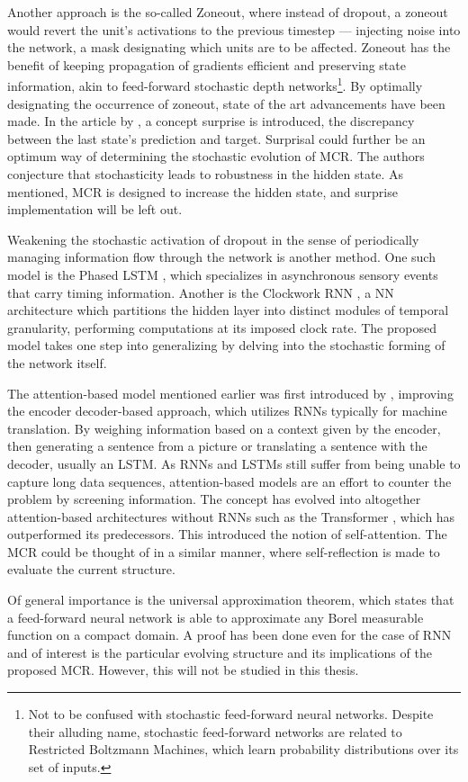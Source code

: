 Another approach is the so-called Zoneout\cite{zoneo}, where instead of dropout, a zoneout would revert the unit's activations to the previous timestep — injecting noise into the network, a mask designating which units are to be affected. Zoneout has the benefit of keeping propagation of gradients efficient and preserving state information, akin to feed-forward stochastic depth networks\footnote{Not to be confused with stochastic feed-forward neural networks. Despite their alluding name, stochastic feed-forward networks are related to Restricted Boltzmann Machines, which learn probability distributions over its set of inputs.}. By optimally designating the occurrence of zoneout, state of the art advancements have been made\cite{Zoneout}. In the article by \textcite{Zoneout}, a concept surprise is introduced, the discrepancy between the last state's prediction and target. Surprisal could further be an optimum way of determining the stochastic evolution of MCR. The authors \textcite{Zoneout} conjecture that stochasticity leads to robustness in the hidden state. As mentioned, MCR is designed to increase the hidden state, and surprise implementation will be left out.

Weakening the stochastic activation of dropout in the sense of periodically managing information flow through the network is another method. One such model is the Phased LSTM \cite{phaselstm}, which specializes in asynchronous sensory events that carry timing information. Another is the Clockwork RNN \cite{Clockwork}, a NN architecture which partitions the hidden layer into distinct modules of temporal granularity, performing computations at its imposed clock rate. The proposed model takes one step into generalizing by delving into the stochastic forming of the network itself.

The attention-based model mentioned earlier was first introduced by \textcite{att}, improving the encoder decoder-based approach, which utilizes RNNs typically for machine translation. By weighing information based on a context given by the encoder, then generating a sentence from a picture or translating a sentence with the decoder, usually an LSTM. As RNNs and LSTMs still suffer from being unable to capture long data sequences, attention-based models are an effort to counter the problem by screening information. The concept has evolved into altogether attention-based architectures without RNNs such as the Transformer \cite{trans}, which has outperformed its predecessors. This introduced the notion of self-attention. The MCR could be thought of in a similar manner, where self-reflection is made to evaluate the current structure. 

Of general importance is the universal approximation theorem, which states that a feed-forward neural network is able to approximate any Borel measurable function on a compact domain. A proof has been done even for the case of RNN \cite{uarnn} and of interest is the particular evolving structure and its implications of the proposed MCR. However, this will not be studied in this thesis.

